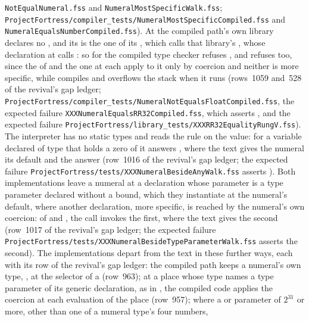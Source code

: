 \begin{description}
\nolinkurl{NotEqualNumeral.fss} and \nolinkurl{NumeralMostSpecificWalk.fss};
\nolinkurl{ProjectFortress/compiler_tests/NumeralMostSpecificCompiled.fss} and
\nolinkurl{NumeralEqualsNumberCompiled.fss}).
At  the compiled path's own library declares no \EXP{\neq},
and its \EXP{=} is the one of its , which calls that library's
\EXP{\sequiv}, whose declaration at  calls \EXP{=}: so for
 the compiled type checker refuses
, and refuses  too, since the \EXP{=} of
 and the one at  each apply to it only by
coercion and neither is more specific, while  compiles and
overflows the stack when it runs
(rows~1059 and~528 of the revival's gap ledger;
\nolinkurl{ProjectFortress/compiler_tests/NumeralNotEqualsFloatCompiled.fss},
the expected failure \nolinkurl{XXXNumeralEqualsRR32Compiled.fss}, which
asserts , and the expected failure
\nolinkurl{ProjectFortress/library_tests/XXXRR32EqualityRungV.fss}).
The interpreter has no static types and reads the rule on the value: for a
variable  declared of type  that holds a zero of
 it answers  , where the text gives the
numeral its default and the answer  (row~1016 of the revival's
gap ledger; the expected failure
\nolinkurl{ProjectFortress/tests/XXXNumeralBesideAnyWalk.fss} asserts
).
Both implementations leave a numeral at a declaration whose parameter is a type
parameter declared without a bound, which they instantiate at the numeral's
default, where another declaration, more specific, is reached by the numeral's
own coercion: of  and
, the call  invokes the first, where the
text gives the second (row~1017 of the revival's gap ledger; the expected
failure \nolinkurl{ProjectFortress/tests/XXXNumeralBesideTypeParameterWalk.fss}
asserts the second).
The implementations depart from the text in these further ways, each with its
row of the revival's gap ledger: the compiled path keeps a numeral's own type,
, at the selector of a
 (row~963); at a place whose type names a type parameter of its
generic declaration, as  in
, the compiled code applies
the coercion at each evaluation of the place (row~957); where a  or 
parameter of $2^{31}$ or more, other than one of a numeral type's four numbers,

\end{description}
